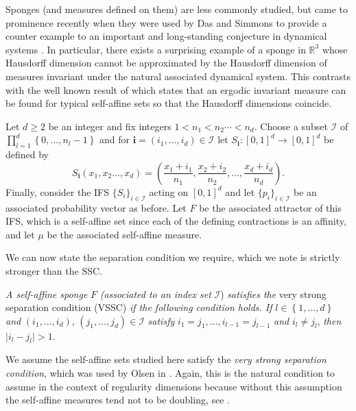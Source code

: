 Sponges (and measures defined on them) are less commonly studied, but came to prominence recently when they were used by Das and Simmons to provide a counter example to an important and long-standing conjecture in dynamical systems \cite{das-simmons}. In particular, there exists a surprising example of a sponge in $\mathbb{R}^3$ whose Hausdorff dimension cannot be approximated by the Hausdorff dimension of measures invariant under the natural associated dynamical system. This contrasts with the well known result of \cite{kaenmaki-affine} which states that an ergodic invariant measure can be found for typical self-affine sets so that the Hausdorff dimensions coincide.


Let $d \geq 2$ be an integer and fix integers $1<n_1 < n_2 \cdots < n_d$.  Choose a subset $\mathcal{I}$ of $\prod_{l=1}^{d} \left\lbrace 0,\ldots, n_l-1 \right\rbrace$ and for $\textbf{i}=(i_1, \ldots, i_d)\in \mathcal{I} $  let $S_{\textbf{i}} \colon [0,1]^d \rightarrow [0,1]^d$ be defined by
\[
S_{\textbf{i}}(x_1,x_2\ldots, x_d)= \left( \frac{x_1+i_1}{n_1}, \frac{x_2+i_2}{n_2}, \ldots, \frac{x_d+i_d}{n_d} \right) .
\]
Finally, consider the IFS $\{S_i\}_{i \in \mathcal{I}}$  acting on $[0,1]^d$ and let $\{p_i\}_{i \in \mathcal{I}}$ be an associated probability vector as before.  Let $F$ be the associated attractor of this IFS, which is a self-affine set since each of the defining contractions is an affinity, and let $\mu$ be the associated self-affine measure. 



We can now state the separation condition we require, which we note is strictly stronger than the SSC.

\begin{definition}
	\emph{A self-affine sponge }$F$\emph{ (associated to an index set }$\mathcal{I}$)\emph{ satisfies the }very strong separation condition (VSSC)\emph{ if the following condition  holds. If }$l \in  \left\{1, \ldots, d\right\}$\emph{ and }$(i_1, \ldots, i_d)$, $(j_1 ,\ldots, j_d)\in \mathcal{I}$\emph{ satisfy }$i_1=j_1, \ldots,  i_{l-1}=j_{l-1}$\emph{ and }$i_l \neq j_l$,\emph{ then }$\lvert i_l - j_l \rvert >1$.
\end{definition} 


We assume the self-affine sets studied here satisfy the \emph{very strong separation condition}, which was used by Olsen in \cite{sponges}. Again, this is the natural condition to assume in the context of regularity dimensions because without this assumption the self-affine measures tend not to be doubling, see \cite{doublingcarpets, fraser-howroyd1}. 

